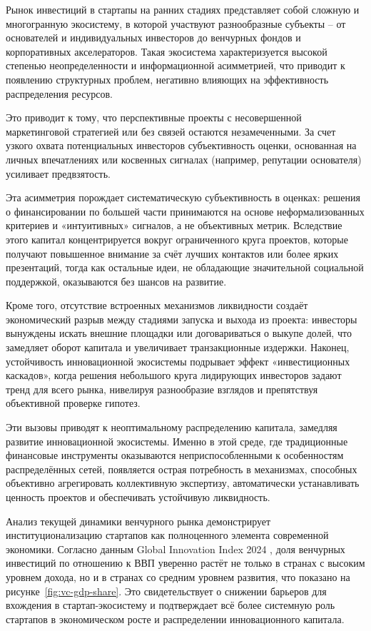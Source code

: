 \documentclass[
    14pt,
    specialist,
    candidate, %
    subf, %
    href,
    dotsinheaders=false
]{disser}
\begin{document}
Рынок инвестиций в стартапы на ранних стадиях представляет собой сложную и многогранную экосистему, в которой участвуют разнообразные субъекты – от основателей и индивидуальных инвесторов до венчурных фондов и корпоративных акселераторов. Такая экосистема характеризуется высокой степенью неопределенности и информационной асимметрией, что приводит к появлению структурных проблем, негативно влияющих на эффективность распределения ресурсов.

Это приводит к тому, что перспективные проекты с несовершенной маркетинговой стратегией или без связей остаются незамеченными. За счет узкого охвата потенциальных инвесторов субъективность оценки, основанная на личных впечатлениях или косвенных сигналах (например, репутации основателя) усиливает предвзятость.

Эта асимметрия порождает систематическую субъективность в оценках: решения о финансировании по большей части принимаются на основе неформализованных критериев и «интуитивных» сигналов, а не объективных метрик. Вследствие этого капитал концентрируется вокруг ограниченного круга проектов, которые получают повышенное внимание за счёт лучших контактов или более ярких презентаций, тогда как остальные идеи, не обладающие значительной социальной поддержкой, оказываются без шансов на развитие.

Кроме того, отсутствие встроенных механизмов ликвидности создаёт экономический разрыв между стадиями запуска и выхода из проекта: инвесторы вынуждены искать внешние площадки или договариваться о выкупе долей, что замедляет оборот капитала и увеличивает транзакционные издержки. Наконец, устойчивость инновационной экосистемы подрывает эффект «инвестиционных каскадов», когда решения небольшого круга лидирующих инвесторов задают тренд для всего рынка, нивелируя разнообразие взглядов и препятствуя объективной проверке гипотез.

Эти вызовы приводят к неоптимальному распределению капитала, замедляя развитие инновационной экосистемы. Именно в этой среде, где традиционные финансовые инструменты оказываются неприспособленными к особенностям распределённых сетей, появляется острая потребность в механизмах, способных объективно агрегировать коллективную экспертизу, автоматически устанавливать ценность проектов и обеспечивать устойчивую ликвидность.

Анализ текущей динамики венчурного рынка демонстрирует институционализацию стартапов как полноценного элемента современной экономики. Согласно данным Global Innovation Index 2024 \cite{gii2024}, доля венчурных инвестиций по отношению к ВВП уверенно растёт не только в странах с высоким уровнем дохода, но и в странах со средним уровнем развития, что показано на рисунке~\ref{fig:vc-gdp-share}. Это свидетельствует о снижении барьеров для вхождения в стартап-экосистему и подтверждает всё более системную роль стартапов в экономическом росте и распределении инновационного капитала.
\end{document}

